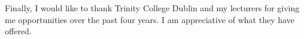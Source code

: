 \documentclass[a4paper,oneside,12pt]{book}
\numberwithin{equation}{chapter} %
\begin{document}
Finally, I would like to thank Trinity College Dublin and my lecturers for giving me opportunities over the past four years.
I am appreciative of what they have offered.




\tableofcontents
\listoffigures
\listoftables
\newpage



\mainmatter









%
\nocite{*}


\appendix
\renewcommand{\thechapter}{A\arabic{chapter}}

\end{document}
